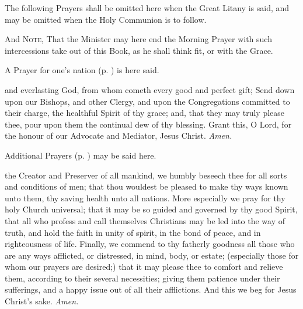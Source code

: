  \begin{rubric}
     The following Prayers shall be omitted here when the Great Litany is said, and may be omitted when the Holy Communion is to follow.
 \end{rubric}
\begin{rubric}
    And \textsc{Note}, That the Minister may here end the Morning Prayer with such intercessions take out of this Book, as he shall think fit, or with the Grace.
\end{rubric}
\vspace{-2ex}
\begin{rubric}
    A Prayer for one's nation (p. \pageref{prayers}) is here said.
\end{rubric}
\vspace{-2ex}
 and everlasting God, from whom cometh every good and perfect gift; Send down upon our Bishops, and other Clergy, and upon the Congregations committed to their charge, the healthful Spirit of thy grace; and, that they may truly please thee, pour upon them the continual dew of thy blessing. Grant this, O Lord, for the honour of our Advocate and Mediator, Jesus Christ. \textit{Amen.}
\begin{rubric}
    Additional Prayers (p. \pageref{prayers}) may be said here.
\end{rubric}
\vspace{-2ex}
 the Creator and Preserver of all mankind, we humbly beseech thee for all sorts and conditions of men; that thou wouldest be pleased to make thy ways known unto them, thy saving health unto all nations. More especially we pray for thy holy Church universal; that it may be so guided and governed by thy good Spirit, that all who profess and call themselves Christians may be led into the way of truth, and hold the faith in unity of spirit, in the bond of peace, and in righteousness of life. Finally, we commend to thy fatherly goodness all those who are any ways afflicted, or distressed, in mind, body, or estate; (especially those for whom our prayers are desired;) that it may please thee to comfort and relieve them, according to their several necessities; giving them patience under their sufferings, and a happy issue out of all their afflictions. And this we beg for Jesus Christ's sake. \textit{Amen.}
